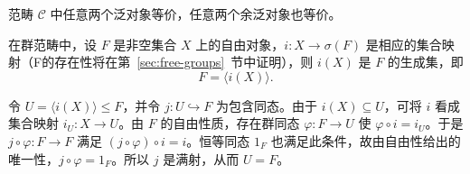\begin{theorem}\label{thm:initial-terminal-unique}
范畴 $\mathcal C$ 中任意两个泛对象等价，任意两个余泛对象也等价。
\end{theorem}

\begin{theorem}\label{thm:free-group-generators}
在群范畴中，设 $F$ 是非空集合 $X$ 上的自由对象，$i:X\to\sigma(F)$ 是相应的集合映射（F的存在性将在第~\ref{sec:free-groups}~节中证明），则 $i(X)$ 是 $F$ 的生成集，即
\[
  F=\langle i(X)\rangle.
\]
\end{theorem}

\begin{purpleproof}
令 $U=\langle i(X)\rangle\leq F$，并令 $j:U\hookrightarrow F$ 为包含同态。由于 $i(X)\subseteq U$，可将 $i$ 看成集合映射 $i_U:X\to U$。由 $F$ 的自由性质，存在群同态 $\varphi:F\to U$ 使 $\varphi\circ i=i_U$。于是 $j\circ\varphi:F\to F$ 满足 $(j\circ\varphi)\circ i=i$。恒等同态 $1_F$ 也满足此条件，故由自由性给出的唯一性，$j\circ\varphi=1_F$。所以 $j$ 是满射，从而 $U=F$。
\end{purpleproof}
